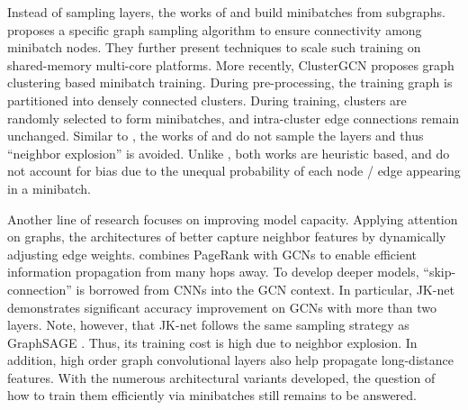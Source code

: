 Instead of sampling layers, the works of \cite{ipdps_arxiv} and \cite{cluster-gcn} build minibatches from subgraphs. 
\cite{ipdps_arxiv} proposes a specific graph sampling algorithm to ensure connectivity among minibatch nodes. They further present techniques to scale such training on shared-memory multi-core platforms. 
More recently, ClusterGCN \citep{cluster-gcn} proposes graph clustering based minibatch training. 
During pre-processing, the training graph is partitioned into densely connected clusters. During training, clusters are randomly selected to form minibatches, and intra-cluster edge connections remain unchanged. 
Similar to {\graphsaint}, the works of \cite{ipdps_arxiv} and \cite{cluster-gcn} do not sample the layers and thus ``neighbor explosion'' is avoided. Unlike {\graphsaint}, both works are heuristic based, and do not account for bias due to the unequal probability of each node / edge appearing in a minibatch. %


Another line of research focuses on improving model capacity. Applying attention on graphs, the architectures of \cite{gat,gaan,graphstar} better capture neighbor features by dynamically adjusting edge weights. 
\cite{rw-gcn} combines PageRank with GCNs to enable efficient information propagation from many hops away. 
To develop deeper models, ``skip-connection'' is borrowed from CNNs \citep{resnet,densenet} into the GCN context. 
In particular, JK-net \cite{jk-net} demonstrates significant accuracy improvement on GCNs with more than two layers. Note, however, that JK-net \citep{jk-net} follows the same sampling strategy as GraphSAGE \citep{graphsage}. Thus, its training cost is high due to neighbor explosion. 
In addition, high order graph convolutional layers \citep{high-order-1,high-order-2,high-order-3} also help propagate long-distance features. 
With the numerous architectural variants developed, the question of how to train them efficiently via minibatches still remains to be answered.

